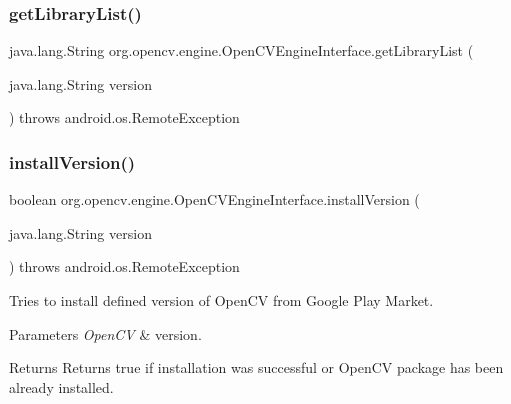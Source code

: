 \mbox{\label{interfaceorg_1_1opencv_1_1engine_1_1_open_c_v_engine_interface_ab98adfcf7de2add59b6b0f5308079b9b}} 
\subsubsection{\texorpdfstring{get\+Library\+List()}{getLibraryList()}}
{\footnotesize\ttfamily java.\+lang.\+String org.\+opencv.\+engine.\+Open\+C\+V\+Engine\+Interface.\+get\+Library\+List (\begin{DoxyParamCaption}\item[{java.\+lang.\+String}]{version }\end{DoxyParamCaption}) throws android.\+os.\+Remote\+Exception}

\mbox{\label{interfaceorg_1_1opencv_1_1engine_1_1_open_c_v_engine_interface_a732afa1d3a88ad6dc6019be41c2383f3}} 
\subsubsection{\texorpdfstring{install\+Version()}{installVersion()}}
{\footnotesize\ttfamily boolean org.\+opencv.\+engine.\+Open\+C\+V\+Engine\+Interface.\+install\+Version (\begin{DoxyParamCaption}\item[{java.\+lang.\+String}]{version }\end{DoxyParamCaption}) throws android.\+os.\+Remote\+Exception}

Tries to install defined version of Open\+CV from Google Play Market. 
\begin{DoxyParams}{Parameters}
{\em Open\+CV} & version. \\
\hline
\end{DoxyParams}
\begin{DoxyReturn}{Returns}
Returns true if installation was successful or Open\+CV package has been already installed. 
\end{DoxyReturn}


